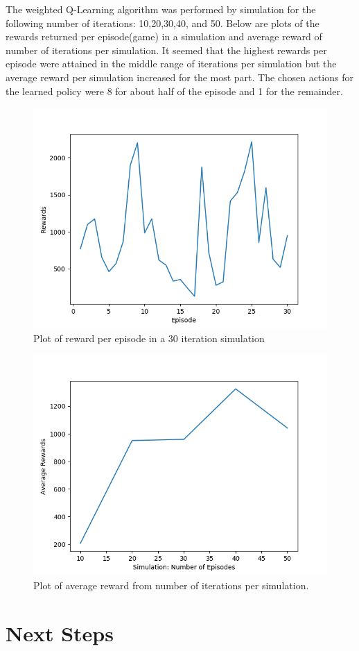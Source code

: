 \documentclass[10pt,twocolumn,letterpaper]{article}
\begin{document}
The weighted Q-Learning algorithm was performed by simulation for the following number of iterations: 10,20,30,40, and 50. Below are plots of the rewards returned per episode(game) in a simulation and average reward of number of iterations per simulation. It seemed that the highest rewards per episode were attained in the middle range of iterations per simulation but the average reward per simulation increased for the most part. The chosen actions for the learned policy were 8 for about half of the episode and 1 for the remainder. 
\begin{figure}[h]
\centering
\includegraphics[width=0.6\linewidth]{numTrails_30.png}
\caption{Plot of reward per episode in a 30 iteration simulation}
\end{figure}

\begin{figure}[h]
\centering
\includegraphics[width=0.6\linewidth]{avg_rewards.png}
\caption{Plot of average reward from number of iterations per simulation.}
\end{figure}



\section*{Next Steps}
\end{document}
